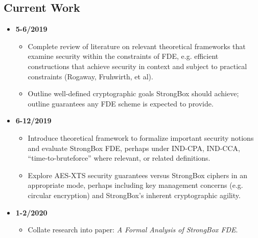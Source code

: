 \subsection{Current Work}

\begin{itemize}
    \item \textbf{5-6/2019}
        \begin{itemize}
            \item Complete review of literature on relevant theoretical
            frameworks that examine security within the constraints of FDE, e.g.
            efficient constructions that achieve security in context and subject
            to practical constraints (Rogaway, Fruhwirth, et al).
            \item Outline well-defined cryptographic goals StrongBox should
            achieve; outline guarantees any FDE scheme is expected to provide.
        \end{itemize}
    \item \textbf{6-12/2019}
        \begin{itemize}
            \item Introduce theoretical framework to formalize important
            security notions and evaluate StrongBox FDE, perhaps under IND-CPA,
            IND-CCA, ``time-to-bruteforce'' where relevant, or related
            definitions.
            \item Explore AES-XTS security guarantees versus StrongBox ciphers
            in an appropriate mode, perhaps including key management concerns
            (e.g. circular encryption) and StrongBox's inherent cryptographic
            agility.
        \end{itemize}
    \item \textbf{1-2/2020}
        \begin{itemize}
            \item Collate research into paper: \textit{A Formal Analysis of
            StrongBox FDE}.
        \end{itemize}
\end{itemize}
